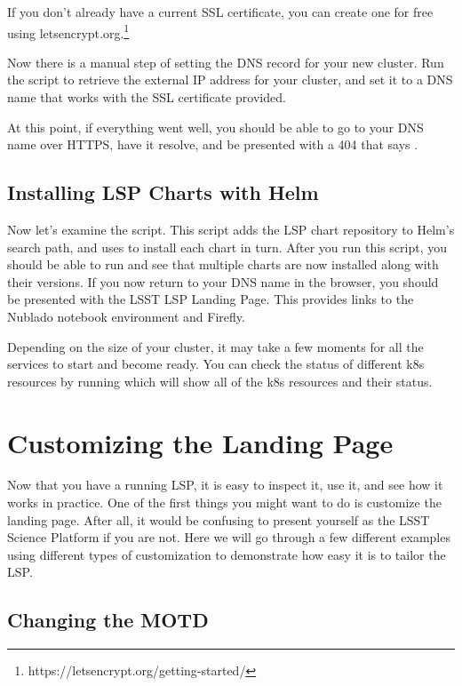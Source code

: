 \documentclass[11pt,twoside]{article}
\begin{document}
If you don't already have a current SSL certificate, you can create one for
free using letsencrypt.org.\footnote{https://letsencrypt.org/getting-started/}

Now there is a manual step of setting the DNS record for your new cluster.
Run the  script to retrieve the external IP address for your
cluster, and set it to a DNS name that works with the SSL certificate provided.

At this point, if everything went well, you should be able to go to your
DNS name over HTTPS, have it resolve, and be presented with a 404 that says
.

\subsection{Installing LSP Charts with Helm}

Now let's examine the  script.  This script adds the LSP
chart repository to Helm's search path, and uses  to install
each chart in turn.  After you run this script, you should be able to run 
and see that multiple charts are now installed along with their versions.  If you
now return to your DNS name in the browser, you should be presented with the LSST
LSP Landing Page.  This provides links to the Nublado notebook environment and
Firefly.

Depending on the size of your cluster, it may take a few moments for all the
services to start and become ready.  You can check the status of different
k8s resources by running  which will show all of
the k8s resources and their status.

\section{Customizing the Landing Page}

Now that you have a running LSP, it is easy to inspect it, use it, and see
how it works in practice.  One of the first things you might want to do is
customize the landing page.  After all, it would be confusing to present
yourself as the LSST Science Platform if you are not.  Here we will go
through a few different examples using different types of customization
to demonstrate how easy it is to tailor the LSP.

\subsection{Changing the MOTD}
\end{document}
